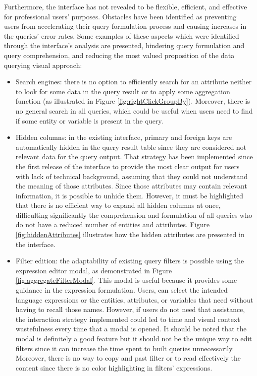Furthermore, the interface has not revealed to be flexible, efficient, and effective for professional users' purposes. Obstacles have been identified as preventing users from accelerating their query formulation process and causing increases in the queries' error rates. Some examples of these aspects which were identified through the interface's analysis are presented, hindering query formulation and query comprehension, and reducing the most valued proposition of the data querying visual approach:

\begin{itemize}
    \item Search engines: there is no option to efficiently search for an attribute neither to look for some data in the query result or to apply some aggregation function (as illustrated in Figure \ref{fig:rightClickGroupBy}). Moreover, there is no general search in all queries, which could be useful when users need to find if some entity or variable is present in the query.
    \item Hidden columns: in the existing interface, primary and foreign keys are automatically hidden in the query result table since they are considered not relevant data for the query output. That strategy has been implemented since the first release of the interface to provide the most clear output for users with lack of technical background, assuming that they could not understand the meaning of those attributes. Since those attributes may contain relevant information, it is possible to unhide them. However, it must be highlighted that there is no efficient way to expand all hidden columns at once, difficulting significantly the comprehension and formulation of all queries who do not have a reduced number of entities and attributes. Figure \ref{fig:hiddenAttributes} illustrates how the hidden attributes are presented in the interface.
    \item Filter edition: the adaptability of existing query filters is possible using the expression editor modal, as demonstrated in Figure \ref{fig:aggregateFilterModal}. This modal is useful because it provides some guidance in the expression formulation. Users, can select the intended language expressions or the entities, attributes, or variables that need without having to recall those names. However, if users do not need that assistance, the interaction strategy implemented could led to time and visual context wastefulness every time that a modal is opened. It should be noted that the modal is definitely a good feature but it should not be the unique way to edit filters since it can increase the time spent to built queries unnecessarily. Moreover, there is no way to copy and past filter or to read effectively the content since there is no color highlighting in filters' expressions.

\end{itemize}
